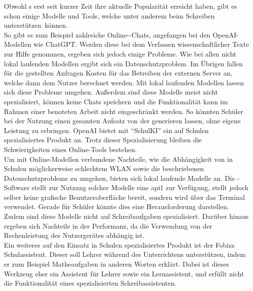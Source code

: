 \documentclass[../main.tex]{subfiles}
\begin{document}
Obwohl s erst seit kurzer Zeit ihre aktuelle Popularität erreicht haben, gibt es schon einige Modelle und Tools, welche unter anderem beim Schreiben \mbox{unterstützen können.} \\
So gibt es zum Beispiel zahlreiche Online--Chats, angefangen bei den OpenAI-Modellen wie ChatGPT. Werden diese bei dem Verfassen wissenschaftlicher Texte zur Hilfe genommen, ergeben 
sich jedoch einige Probleme. Wie bei allen nicht lokal laufenden Modellen ergibt sich ein Datenschutzproblem. Im Übrigen fallen für die gestellten Anfragen Kosten für das Betreiben der 
externen Server an, welche dann dem Nutzer berechnet werden. Mit lokal laufenden Modellen lassen sich diese Probleme umgehen. Außerdem sind diese Modelle meist nicht spezialisiert, 
können keine Chats speichern und die Funktionalität kann im Rahmen einer benoteten Arbeit nicht eingeschränkt werden. So könnten Schüler bei der Nutzung einen gesamten Aufsatz von 
der  generieren lassen, ohne eigene Leistung zu erbringen. OpenAI bietet mit "`SchulKI"' ein auf Schulen spezialisiertes Produkt an. Trotz dieser Spezialisierung bleiben die 
Schwierigkeiten eines Online-Tools bestehen.\cite{schulki}\\ 
Um mit Online-Modellen verbundene Nachteile, wie die Abhängigkeit von in Schulen möglicherweise schlechtem WLAN sowie die beschriebenen Datenschutzprobleme zu umgehen, bieten sich 
lokal laufende Modelle an. Die -Software  stellt zur Nutzung solcher Modelle eine \acrshort{api1} zur Verfügung, stellt jedoch selber keine grafische 
Benutzeroberfläche bereit, sondern wird über das Terminal verwendet. Gerade für Schüler könnte dies eine Herausforderung darstellen. Zudem sind diese Modelle nicht auf Schreibaufgaben 
spezialisiert. Darüber hinaus ergeben sich Nachteile in der Performanz, da die Verwendung von der Rechenleistung des Nutzergerätes abhängig ist.\cite{ollamaSchreibassi}\\
Ein weiteres auf den Einsatz in Schulen spezialisiertes Produkt ist der Fobizz Schulassistent. Dieser soll Lehrer während des Unterrichtens unterstützen, indem er zum Beispiel 
Matheaufgaben in anderen Worten erklärt. Dabei ist dieses Werkzeug eher ein Assistent für Lehrer sowie ein Lernassistent, und erfüllt nicht die Funktionalität eines spezialisierten 
Schreibassistenten.\cite{fobizz}\\ 
\end{document}
